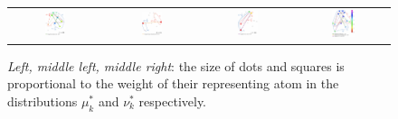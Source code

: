 \begin{figure}[t]
\begin{tabular}{@{}c@{}c@{}c@{}c@{}}
\includegraphics[width=0.24\textwidth]{sections/appendix/aistats2021_eot/figures/dual_MOT_1_neg_norm.png}&
\includegraphics[width=0.24\textwidth]{sections/appendix/aistats2021_eot/figures/dual_MOT_2_neg_norm.png}&
\includegraphics[width=0.24\textwidth]{sections/appendix/aistats2021_eot/figures/dual_MOT_3_neg_norm.png}&
\includegraphics[width=0.275\textwidth]{sections/appendix/aistats2021_eot/figures/dual_MOT_1_2_3_neg_norm.png}
\end{tabular}
\caption{\emph{Left, middle left, middle right}: the size of dots and squares is proportional to the weight of their representing atom in the distributions $\mu_k^{*}$ and $\nu_k^{*}$ respectively. %
}
\end{figure}
